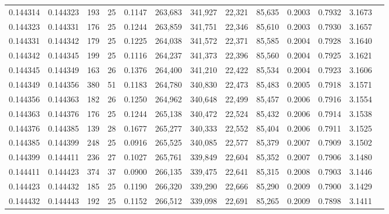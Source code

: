 \begin{tabular}{rrrrrrrrrrrrr}
0.144314 & 0.144323 & 193 &  25 &                                     0.1147 & 263,683 & 341,927 &  22,321 &  85,635 & 0.2003 & 0.7932 & 3.1673 \\
0.144323 & 0.144331 & 176 &  25 &                                     0.1244 & 263,859 & 341,751 &  22,346 &  85,610 & 0.2003 & 0.7930 & 3.1657 \\
0.144331 & 0.144342 & 179 &  25 &                                     0.1225 & 264,038 & 341,572 &  22,371 &  85,585 & 0.2004 & 0.7928 & 3.1640 \\
0.144342 & 0.144345 & 199 &  25 &                                     0.1116 & 264,237 & 341,373 &  22,396 &  85,560 & 0.2004 & 0.7925 & 3.1621 \\
0.144345 & 0.144349 & 163 &  26 &                                     0.1376 & 264,400 & 341,210 &  22,422 &  85,534 & 0.2004 & 0.7923 & 3.1606 \\
0.144349 & 0.144356 & 380 &  51 &                                     0.1183 & 264,780 & 340,830 &  22,473 &  85,483 & 0.2005 & 0.7918 & 3.1571 \\
0.144356 & 0.144363 & 182 &  26 &                                     0.1250 & 264,962 & 340,648 &  22,499 &  85,457 & 0.2006 & 0.7916 & 3.1554 \\
0.144363 & 0.144376 & 176 &  25 &                                     0.1244 & 265,138 & 340,472 &  22,524 &  85,432 & 0.2006 & 0.7914 & 3.1538 \\
0.144376 & 0.144385 & 139 &  28 &                                     0.1677 & 265,277 & 340,333 &  22,552 &  85,404 & 0.2006 & 0.7911 & 3.1525 \\
0.144385 & 0.144399 & 248 &  25 &                                     0.0916 & 265,525 & 340,085 &  22,577 &  85,379 & 0.2007 & 0.7909 & 3.1502 \\
0.144399 & 0.144411 & 236 &  27 &                                     0.1027 & 265,761 & 339,849 &  22,604 &  85,352 & 0.2007 & 0.7906 & 3.1480 \\
0.144411 & 0.144423 & 374 &  37 &                                     0.0900 & 266,135 & 339,475 &  22,641 &  85,315 & 0.2008 & 0.7903 & 3.1446 \\
0.144423 & 0.144432 & 185 &  25 &                                     0.1190 & 266,320 & 339,290 &  22,666 &  85,290 & 0.2009 & 0.7900 & 3.1429 \\
0.144432 & 0.144443 & 192 &  25 &                                     0.1152 & 266,512 & 339,098 &  22,691 &  85,265 & 0.2009 & 0.7898 & 3.1411 \\

\end{tabular}
